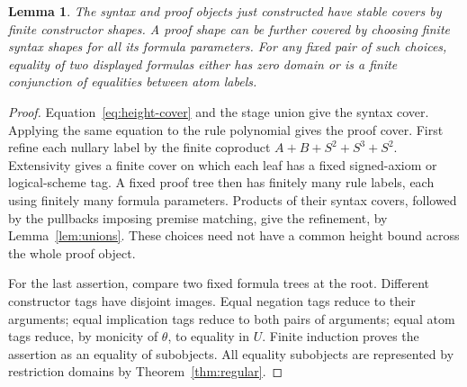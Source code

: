 \documentclass[11pt]{article}
\newtheorem{lemma}[theorem]{Lemma}
\theoremstyle{definition}\newtheorem{definition}[theorem]{Definition}
\theoremstyle{remark}\newtheorem{remark}[theorem]{Remark}
\begin{document}
\begin{lemma}\label{lem:shapes}
The syntax and proof objects just constructed have stable covers by
finite constructor shapes. A proof shape can be further covered by
choosing finite syntax shapes for all its formula parameters.
For any fixed pair of such choices, equality of two displayed
formulas either has zero domain or is a finite conjunction of
equalities between atom labels.
\end{lemma}
\begin{proof}
Equation~\eqref{eq:height-cover} and the stage union give the syntax
cover. Applying the same equation to the rule polynomial gives
the proof cover. First refine each nullary label by the finite
coproduct \(A+B+S^2+S^3+S^2\). Extensivity gives a finite cover
on which each leaf has a fixed signed-axiom or logical-scheme tag.
A fixed proof tree then has finitely many rule labels,
each using finitely many formula parameters. Products of their
syntax covers, followed by the pullbacks imposing premise matching,
give the refinement, by Lemma~\ref{lem:unions}. These choices need
not have a common height bound across the whole proof object.

For the last assertion, compare two fixed formula trees at the root.
Different constructor tags have disjoint images. Equal negation
tags reduce to their arguments; equal implication tags reduce to
both pairs of arguments; equal atom tags reduce, by monicity of
\(\theta\), to equality in \(U\). Finite induction proves the
assertion as an equality of subobjects. All equality subobjects
are represented by restriction domains by Theorem~\ref{thm:regular}.
\end{proof}
\end{document}
